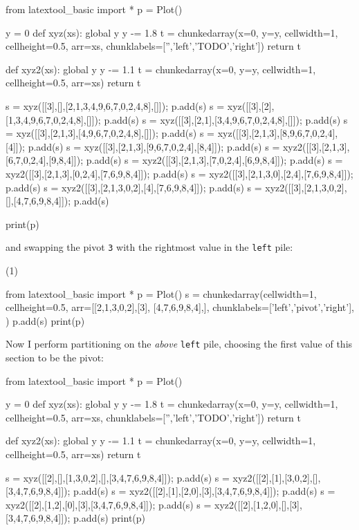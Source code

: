 {\small
\begin{python}
from latextool_basic import *
p = Plot()

y = 0
def xyz(xs):
    global y
    y -= 1.8
    t = chunkedarray(x=0, y=y,
                        cellwidth=1, 
                        cellheight=0.5,
                        arr=xs,
                        chunklabels=['','left','TODO','right'])
    return t

def xyz2(xs):
    global y
    y -= 1.1
    t = chunkedarray(x=0, y=y,
                        cellwidth=1, 
                        cellheight=0.5,
                        arr=xs)
    return t

s = xyz([[3],[],[2,1,3,4,9,6,7,0,2,4,8],[]]); p.add(s)
s = xyz([[3],[2],[1,3,4,9,6,7,0,2,4,8],[]]); p.add(s)
s = xyz([[3],[2,1],[3,4,9,6,7,0,2,4,8],[]]); p.add(s)
s = xyz([[3],[2,1,3],[4,9,6,7,0,2,4,8],[]]); p.add(s)
s = xyz([[3],[2,1,3],[8,9,6,7,0,2,4],[4]]); p.add(s)
s = xyz([[3],[2,1,3],[9,6,7,0,2,4],[8,4]]); p.add(s)
s = xyz2([[3],[2,1,3],[6,7,0,2,4],[9,8,4]]); p.add(s)
s = xyz2([[3],[2,1,3],[7,0,2,4],[6,9,8,4]]); p.add(s)
s = xyz2([[3],[2,1,3],[0,2,4],[7,6,9,8,4]]); p.add(s)
s = xyz2([[3],[2,1,3,0],[2,4],[7,6,9,8,4]]); p.add(s)
s = xyz2([[3],[2,1,3,0,2],[4],[7,6,9,8,4]]); p.add(s)
s = xyz2([[3],[2,1,3,0,2],[],[4,7,6,9,8,4]]); p.add(s)

print(p)
\end{python}
}

and swapping the pivot \verb!3! with the rightmost value in the \verb!left!
pile:
\begin{center}
(1)
\end{center}
{\small
\begin{python}
from latextool_basic import *
p = Plot()
s = chunkedarray(cellwidth=1,
                   cellheight=0.5,
                   arr=[[2,1,3,0,2],[3], [4,7,6,9,8,4],],
                   chunklabels=['left','pivot','right'],
)
p.add(s)
print(p)
\end{python}
}

Now I perform partitioning on the \textit{above} \verb!left! pile,
choosing the first value of this section to be the pivot:
{\small
\begin{python}
from latextool_basic import *
p = Plot()

y = 0
def xyz(xs):
    global y
    y -= 1.8
    t = chunkedarray(x=0, y=y,
                        cellwidth=1, 
                        cellheight=0.5,
                        arr=xs,
                        chunklabels=['','left','TODO','right'])
    return t

def xyz2(xs):
    global y
    y -= 1.1
    t = chunkedarray(x=0, y=y,
                        cellwidth=1, 
                        cellheight=0.5,
                        arr=xs)
    return t

s = xyz([[2],[],[1,3,0,2],[],[3,4,7,6,9,8,4]]); p.add(s)
s = xyz2([[2],[1],[3,0,2],[],[3,4,7,6,9,8,4]]); p.add(s)
s = xyz2([[2],[1],[2,0],[3],[3,4,7,6,9,8,4]]); p.add(s)
s = xyz2([[2],[1,2],[0],[3],[3,4,7,6,9,8,4]]); p.add(s)
s = xyz2([[2],[1,2,0],[],[3],[3,4,7,6,9,8,4]]); p.add(s)
print(p)
\end{python}
}


